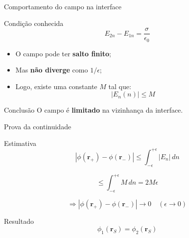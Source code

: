 \documentclass[aspectratio=169,11pt]{beamer}
\begin{document}
\begin{frame}{Comportamento do campo na interface}
\begin{block}{Condição conhecida}
\begin{equation}
E_{2n} - E_{1n} = \frac{\sigma}{\epsilon_0}
\end{equation}
\end{block}

\pause

\begin{itemize}
\item O campo pode ter \textbf{salto finito};
\item Mas \textbf{não diverge} como $1/\epsilon$;
\item Logo, existe uma constante $M$ tal que:
\begin{equation}
|E_n(n)| \le M
\end{equation}
\end{itemize}

\pause

\begin{alertblock}{Conclusão}
O campo é \textbf{limitado} na vizinhança da interface.
\end{alertblock}
\end{frame}

\begin{frame}{Prova da continuidade}
\begin{block}{Estimativa}
\begin{equation}
|\phi(\mathbf r_+) - \phi(\mathbf r_-)| 
\le \int_{-\epsilon}^{+\epsilon} |E_n|\, dn
\end{equation}
\end{block}

\pause

\begin{equation}
\le \int_{-\epsilon}^{+\epsilon} M\, dn = 2M\epsilon
\end{equation}

\pause

\begin{equation}
\Rightarrow
|\phi(\mathbf r_+) - \phi(\mathbf r_-)| \to 0
\quad (\epsilon \to 0)
\end{equation}

\pause

\begin{alertblock}{Resultado}
\begin{equation}
\phi_1(\mathbf r_S)=\phi_2(\mathbf r_S)
\end{equation}
\end{alertblock}
\end{frame}
\end{document}
